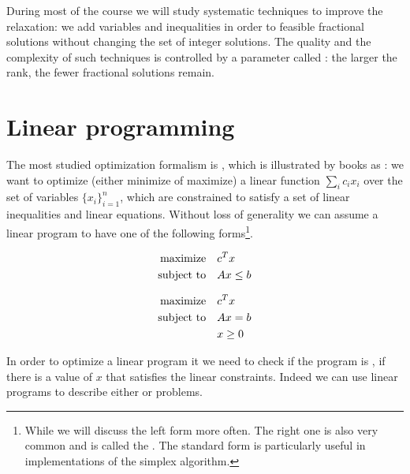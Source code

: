 \documentclass[a4paper,twoside,justified]{tufte-handout}
\begin{document}
During most of the course we will study systematic techniques to
improve the relaxation: we add variables and inequalities in order to
 feasible fractional solutions without changing
the set of integer solutions. The quality and the complexity of such
techniques is controlled by a parameter called :
the larger the rank, the fewer fractional solutions remain.

\section{Linear programming}

The most studied optimization formalism is , which is illustrated by books as
\cite{matousek2007understanding}: we want to optimize (either minimize
of maximize) a linear function $ \sum_{i} c_{i}x_{i} $ over the set of
variables $ \{x_{i}\}^{n}_{i=1} $, which are constrained to satisfy a
set of linear inequalities and linear equations. Without loss of
generality we can assume a linear program to have one of the following
forms\footnote{While we will discuss the left form more often. The
  right one is also very common and is called the
  . The standard form is particularly
  useful in implementations of the simplex algorithm.}.

\begin{figure}
\begin{minipage}[t]{0.5\textwidth}
\begin{alignat*}{2}
  \text{maximize}\hspace{1em}& c^{T}x\\
  \text{subject to}\hspace{1em}& Ax \leq b
\end{alignat*}
\end{minipage}
\begin{minipage}[t]{0.5\textwidth}
\begin{alignat}{2}\label{eq:lpforms}
  \maximize c^{T}x \notag\\
  \subjectto Ax = b\\
  & x \geq 0\notag
\end{alignat}
\end{minipage}
\end{figure}


In order to optimize a linear program it we need to check if the
program is , \ie if there is a value of $ x $
that satisfies the linear constraints. Indeed we can use linear
programs to describe either  or
 problems.
\end{document}
